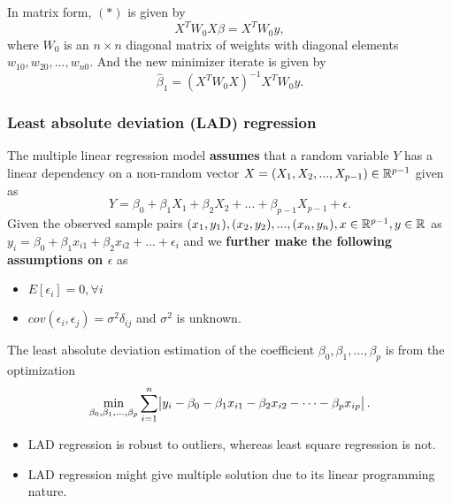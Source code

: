 \begin{refsection}
\begin{lemma}
\begin{itemize}
In matrix form, $(*)$ is given by
$$X^TW_0X\beta = X^TW_0y,$$
where $W_0$ is an $n\times n$ diagonal matrix of weights with diagonal elements $w_{10},w_{20},...,w_{n0}$. 
And the new minimizer iterate is given by
$$\hat{\beta}_1 = (X^TW_0X)^{-1}X^TW_0y.$$
\end{itemize}
\end{lemma}


\subsubsection{Least absolute deviation (LAD) regression}

\begin{definition}\label{ch:statistical-models:th:multipleLinearRegressionLeastAbsoluteDeviation}	The multiple linear regression model \textbf{assumes} that a random variable $Y$ has a linear dependency on a non-random vector $X = (X_1,X_2,...,X_{p-1}) \in \mathbb{R}^{p-1}$ given as
	$$Y = \beta_0 + \beta_1 X_1 +\beta_2 X_2 + ... +\beta_{p-1} X_{p-1} + \epsilon.$$
	Given the observed sample pairs $(x_1,y_1),(x_2,y_2),..., (x_n,y_n), x\in \mathbb{R}^{p-1}, y\in \mathbb{R}$ as $y_i = \beta_0 + \beta_1 x_{i1} + \beta_2 x_{i2} + ... + \epsilon_i$ and we \textbf{further make the following assumptions on $\epsilon$} as
	\begin{itemize}
		\item $E[\epsilon_i] = 0,\forall i$
		\item $cov(\epsilon_i,\epsilon_j) = \sigma^2\delta_{ij}$ and $\sigma^2$ is unknown.
	\end{itemize} 	
	
	The least absolute deviation estimation of the coefficient $\beta_0,\beta_1,...,\beta_p$ is from the optimization
	$$\min_{\beta_0,\beta_1,...,\beta_p} \sum_{i=1}^{n} \abs{y_i - \beta_0 - \beta_1 x_{i1} - \beta_2 x_{i2} - \cdots -\beta_p x_{ip}}.$$
\end{definition}

\begin{remark}\hfill
\begin{itemize}
	\item LAD regression is robust to outliers, whereas least square regression is not.
	\item LAD regression might give multiple solution due to its linear programming nature.
\end{itemize}	
\end{remark}



\end{refsection}
